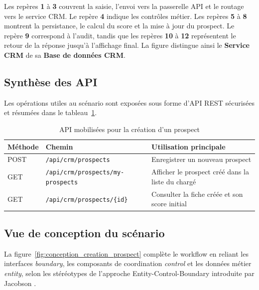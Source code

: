 {\footnotesize
\noindent
Les repères \textbf{1} à \textbf{3} couvrent la saisie, l'envoi vers la
passerelle API et le routage vers le service CRM. Le repère \textbf{4} indique
les contrôles métier. Les repères \textbf{5} à \textbf{8} montrent la
persistance, le calcul du score et la mise à jour du prospect. Le repère
\textbf{9} correspond à l'audit, tandis que les repères \textbf{10} à
\textbf{12} représentent le retour de la réponse jusqu'à l'affichage final. La
figure distingue ainsi le \textbf{Service CRM} de sa \textbf{Base de données CRM}.
\par}

\subsection{Synthèse des API}

Les opérations utiles au scénario sont exposées sous forme d'API REST sécurisées et
résumées dans le tableau~\ref{tab:endpoints_prospect}.

\begin{table}[H]
    \centering
    \caption{API mobilisées pour la création d'un prospect}
    \label{tab:endpoints_prospect}
    \footnotesize
    \renewcommand{\arraystretch}{1.08}
    \begin{tabularx}{\textwidth}{|p{1.7cm}|p{5.4cm}|X|}
        \hline
        \textbf{Méthode} & \textbf{Chemin} & \textbf{Utilisation principale} \\ \hline
        POST   & {\scriptsize\texttt{/api/crm/prospects}}                  & Enregistrer un nouveau prospect \\ \hline
        GET    & {\scriptsize\texttt{/api/crm/prospects/my-prospects}}     & Afficher le prospect créé dans la liste du chargé \\ \hline
        GET    & {\scriptsize\texttt{/api/crm/prospects/\{id\}}}           & Consulter la fiche créée et son score initial \\ \hline
    \end{tabularx}
\end{table}

\subsection{Vue de conception du scénario}

La figure~\ref{fig:conception_creation_prospect} complète le workflow en
reliant les interfaces \textit{boundary}, les composants de coordination
\textit{control} et les données métier \textit{entity}, selon les stéréotypes
de l'approche Entity-Control-Boundary introduite par Jacobson
\cite{jacobson_oose}.

